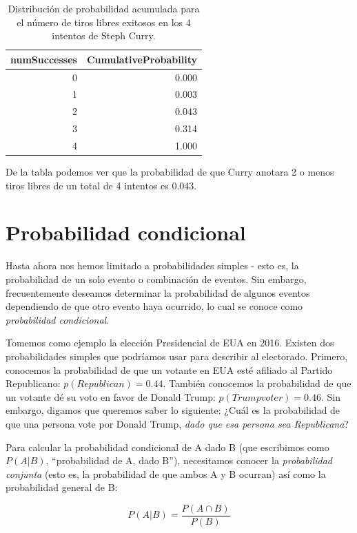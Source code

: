 \documentclass[
  12pt,
]{book}
\begin{document}
\begin{table}

\caption{\label{tab:CurryCumulativeProb}Distribución de probabilidad acumulada para el número de tiros libres exitosos en los 4 intentos de Steph Curry.}
\centering
\begin{tabular}[t]{r|r}
\hline
numSuccesses & CumulativeProbability\\
\hline
0 & 0.000\\
\hline
1 & 0.003\\
\hline
2 & 0.043\\
\hline
3 & 0.314\\
\hline
4 & 1.000\\
\hline
\end{tabular}
\end{table}

De la tabla podemos ver que la probabilidad de que Curry anotara 2 o menos tiros libres de un total de 4 intentos es 0.043.

\hypertarget{conditional-probability}{%
\section{Probabilidad condicional}\label{conditional-probability}}

Hasta ahora nos hemos limitado a probabilidades simples - esto es, la probabilidad de un solo evento o combinación de eventos. Sin embargo, frecuentemente deseamos determinar la probabilidad de algunos eventos dependiendo de que otro evento haya ocurrido, lo cual se conoce como \emph{probabilidad condicional}.

Tomemos como ejemplo la elección Presidencial de EUA en 2016. Existen dos probabilidades simples que podríamos usar para describir al electorado. Primero, conocemos la probabilidad de que un votante en EUA esté afiliado al Partido Republicano: \(p(Republican) = 0.44\). También conocemos la probabilidad de que un votante dé su voto en favor de Donald Trump: \(p(Trump voter)=0.46\). Sin embargo, digamos que queremos saber lo siguiente: ¿Cuál es la probabilidad de que una persona vote por Donald Trump, \emph{dado que esa persona sea Republicana}?

Para calcular la probabilidad condicional de A dado B (que escribimos como \(P(A|B)\), ``probabilidad de A, dado B''), necesitamos conocer la \emph{probabilidad conjunta} (esto es, la probabilidad de que ambos A y B ocurran) así como la probabilidad general de B:

\[
P(A|B) = \frac{P(A \cap B)}{P(B)}
\]
\end{document}
